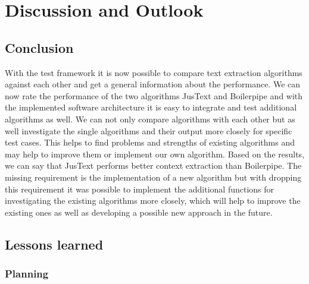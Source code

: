 
\chapter{Discussion and Outlook} %

\label{Discussion and Outlook} %



\section {Conclusion}

With the test framework it is now possible to compare text extraction algorithms against each other and get a general information about the performance. We can now rate the performance of the two algorithms JusText and Boilerpipe and with the implemented software architecture it is easy to integrate and test additional algorithms as well. We can not only compare algorithms with each other but as well investigate the single algorithms and their output more closely for specific test cases. This helps to find problems and strengths of existing algorithms and may help to improve them or implement our own algorithm. Based on the results, we can say that JusText performs better context extraction than Boilerpipe.
The missing requirement is the implementation of a new algorithm but with dropping this requirement it was possible to implement the additional functions for investigating the existing algorithms more closely, which will help to improve the existing ones as well as developing a possible new approach in the future.

\section{Lessons learned}

\subsection{Planning}


